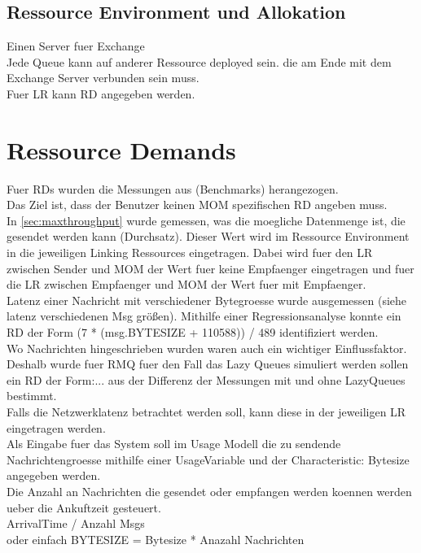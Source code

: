 \subsection{Ressource Environment und Allokation}
Einen Server fuer Exchange \\
Jede Queue kann auf anderer Ressource deployed sein. die am Ende mit dem Exchange Server verbunden sein muss.\\
Fuer LR kann RD angegeben werden.

\section{Ressource Demands}
Fuer RDs wurden die Messungen aus (Benchmarks) herangezogen. \\ 
Das Ziel ist, dass der Benutzer keinen MOM spezifischen RD angeben muss. \\
In \autoref{sec:maxthroughput} wurde gemessen, was die moegliche Datenmenge ist, die gesendet werden kann (Durchsatz). Dieser Wert wird im Ressource Environment in die jeweiligen Linking Ressources eingetragen. Dabei wird fuer den LR zwischen Sender und MOM der Wert fuer keine Empfaenger eingetragen und fuer die LR zwischen Empfaenger und MOM der Wert fuer mit Empfaenger. \\

Latenz einer Nachricht mit verschiedener Bytegroesse wurde ausgemessen (siehe latenz verschiedenen Msg größen). Mithilfe einer Regressionsanalyse konnte ein RD der Form (7 * (msg.BYTESIZE + 110588)) / 489 identifiziert werden.\\

Wo Nachrichten hingeschrieben wurden waren auch ein wichtiger Einflussfaktor. Deshalb wurde fuer RMQ fuer den Fall das Lazy Queues simuliert werden sollen ein RD der Form:... aus der Differenz der Messungen mit und ohne LazyQueues bestimmt. \\

Falls die Netzwerklatenz betrachtet werden soll, kann diese in der jeweiligen LR eingetragen werden.\\

Als Eingabe fuer das System soll im Usage Modell die zu sendende Nachrichtengroesse mithilfe einer UsageVariable und der Characteristic: Bytesize angegeben werden.\\

Die Anzahl an Nachrichten die gesendet oder empfangen werden koennen werden ueber die Ankuftzeit gesteuert.\\
ArrivalTime / Anzahl Msgs \\
oder einfach BYTESIZE = Bytesize * Anazahl Nachrichten \\

